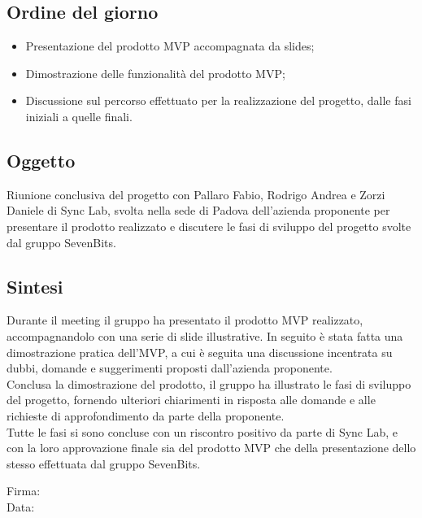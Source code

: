 \documentclass[10pt]{article}
\begin{document}
\subsection{Ordine del giorno}
\begin{itemize}
    \item Presentazione del prodotto MVP accompagnata da slides;
    \item Dimostrazione delle funzionalità del prodotto MVP;
    \item Discussione sul percorso effettuato per la realizzazione del progetto, dalle fasi iniziali a quelle finali.
\end{itemize}

\subsection{Oggetto}
Riunione conclusiva del progetto con Pallaro Fabio, Rodrigo Andrea e Zorzi Daniele di Sync Lab, svolta nella sede di Padova dell'azienda proponente
per presentare il prodotto realizzato e discutere le fasi di sviluppo del progetto svolte dal gruppo SevenBits.

\subsection{Sintesi}
Durante il meeting il gruppo ha presentato il prodotto MVP realizzato, accompagnandolo con una serie di slide illustrative. In seguito è stata fatta una dimostrazione pratica
dell'MVP, a cui è seguita una discussione incentrata su dubbi, domande e suggerimenti proposti dall'azienda proponente.\\
Conclusa la dimostrazione del prodotto, il gruppo ha illustrato le fasi di sviluppo del progetto, fornendo ulteriori chiarimenti in risposta alle domande e alle richieste di approfondimento da parte 
della proponente.\\
Tutte le fasi si sono concluse con un riscontro positivo da parte di Sync Lab, e con la loro approvazione finale sia del prodotto MVP che della presentazione dello stesso
effettuata dal gruppo SevenBits.\\


\vfill
\begin{minipage}{10cm}
Firma: \hrulefill \\
\vspace{2mm}
Data: \dotfill
\end{minipage}
\end{document}
